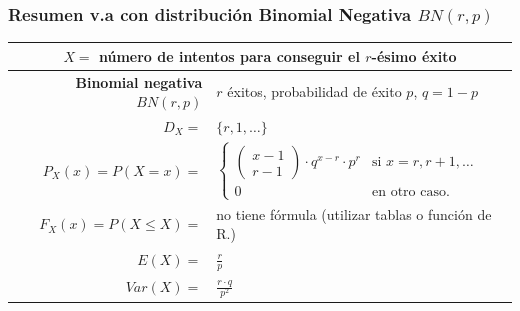 \documentclass[handout]{beamer}
\renewcommand{\leq}{\leqslant}
\theoremstyle{plain}
\theoremstyle{definition}
\begin{document}
\begin{frame}[fragile]
\frametitle{Resumen v.a con distribución Binomial Negativa $BN(r,p)$}
\scriptsize
\setlength{\tabcolsep}{1pt}
\begin{table}
\centering
\begin{tabular}{|rl|}
\hline
\multicolumn{2}{|c|}{$X=$ número de intentos para conseguir el $r$-ésimo éxito}\\
\hline
\hline
\textbf{Binomial negativa}  $BN(r,p)$ & $r$ éxitos, probabilidad de éxito $p$, $q=1-p$\\
\hline \hline
$D_X=$ &  $\{r,1,\ldots\}$ 
\\\hline
$P_X(x)=P(X=x)=$ &
$\left\{
\begin{array}{cc}
\left(
\begin{array}{c}
x-1\\ r-1
\end{array}
\right)\cdot
q^{x-r}\cdot p^r & \mbox{si }  x=r,r+1,\ldots \\
0 & \mbox{en otro caso.}
\end{array}
\right.$
\\
\hline
$F_X(x)=P(X\leq X)=$ & no tiene fórmula (utilizar tablas o función de R.)\\
\hline
$E(X)=$ &  $\frac{r}{p}$\\
$Var(X)=$ & $\frac{r\cdot q}{p^2}$ \\
\hline
\end{tabular}
\end{table}

\normalsize

\end{frame}
\end{document}
